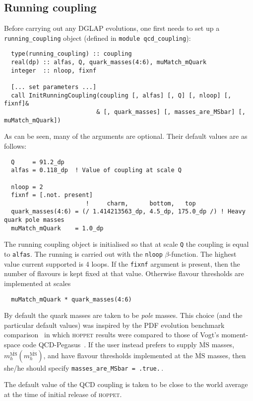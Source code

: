 \documentclass[12pt]{article}
\newcommand{\MSbar}{\overline{\mathrm{MS}}}
\newcommand{\hoppet}{\textsc{hoppet}\xspace}
\newcommand{\ttt}[1]{\texttt{#1}}
\begin{document}
\subsection{Running coupling}
\label{sec:run-coupl}

Before carrying out any DGLAP evolutions, one first needs to set up 
a \ttt{running\_coupling} object (defined in \ttt{module
  qcd\_coupling}):
\begin{lstlisting}
  type(running_coupling) :: coupling
  real(dp) :: alfas, Q, quark_masses(4:6), muMatch_mQuark
  integer  :: nloop, fixnf

  [... set parameters ...]
  call InitRunningCoupling(coupling [, alfas] [, Q] [, nloop] [, fixnf]&
                          & [, quark_masses] [, masses_are_MSbar] [, muMatch_mQuark])
\end{lstlisting}
As can be seen, many of the arguments are optional. Their default
values are as follows:
\begin{lstlisting}
  Q     = 91.2_dp
  alfas = 0.118_dp  ! Value of coupling at scale Q
 
  nloop = 2
  fixnf = [.not. present]
                       !     charm,      bottom,   top
  quark_masses(4:6) = (/ 1.414213563_dp, 4.5_dp, 175.0_dp /) ! Heavy quark pole masses
  muMatch_mQuark    = 1.0_dp
\end{lstlisting}
The running coupling object is initialised so that at scale \ttt{Q}
the coupling is equal to \ttt{alfas}. The running is carried out with
the \ttt{nloop} $\beta$-function. 
%
The highest value current supported is 4 loops.
%
If the \ttt{fixnf} argument is
present, then the number of flavours is kept fixed at that
value. Otherwise flavour thresholds are implemented at scales
\begin{lstlisting}
  muMatch_mQuark * quark_masses(4:6)
\end{lstlisting}
By default the quark masses are taken to be \emph{pole} masses.
%
This choice (and the particular default values) was inspired by the
PDF evolution benchmark comparison~\cite{Benchmarks} in which \hoppet
results were compared to those of Vogt's moment-space code
QCD-Pegasus~\cite{Pegasus}. 
%
If the user instead prefers to supply $\MSbar$ masses,
$m_h^{\MSbar}(m_h^{\MSbar})$, and have flavour thresholds implemented
at the $\MSbar$ masses, then she/he should specify
\ttt{masses\_are\_MSbar = .true.}\,.

The default value of the QCD coupling is
taken to be close to the world average at the time of initial release
of \hoppet \cite{Bethke:2006ac}.
%
\end{document}
